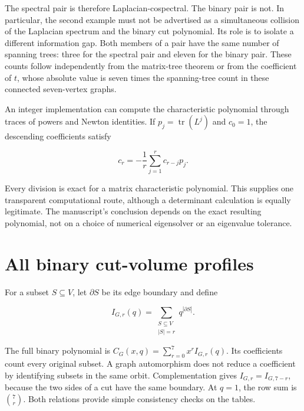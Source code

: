 \documentclass[
  11pt,
  a4paper,
]{report}
\begin{document}
The spectral pair is therefore Laplacian-cospectral. The binary pair is
not. In particular, the second example must not be advertised as a
simultaneous collision of the Laplacian spectrum and the binary cut
polynomial. Its role is to isolate a different information gap. Both
members of a pair have the same number of spanning trees: three for the
spectral pair and eleven for the binary pair. These counts follow
independently from the matrix-tree theorem or from the coefficient of
\(t\), whose absolute value is seven times the spanning-tree count in
these connected seven-vertex graphs.

An integer implementation can compute the characteristic polynomial
through traces of powers and Newton identities. If
\(p_j=\operatorname{tr}(L^j)\) and \(c_0=1\), the descending
coefficients satisfy

\[
c_r=-\frac1r\sum_{j=1}^r c_{r-j}p_j.
\]

Every division is exact for a matrix characteristic polynomial. This
supplies one transparent computational route, although a determinant
calculation is equally legitimate. The manuscript's conclusion depends
on the exact resulting polynomial, not on a choice of numerical
eigensolver or an eigenvalue tolerance.

\hypertarget{all-binary-cut-volume-profiles}{%
\section{All binary cut-volume
profiles}\label{all-binary-cut-volume-profiles}}

For a subset \(S\subseteq V\), let \(\partial S\) be its edge boundary
and define

\[
I_{G,r}(q)=\sum_{\substack{S\subseteq V\\ |S|=r}}q^{|\partial S|}.
\]

The full binary polynomial is \(C_G(x,q)=\sum_{r=0}^7x^rI_{G,r}(q)\).
Its coefficients count every original subset. A graph automorphism does
not reduce a coefficient by identifying subsets in the same orbit.
Complementation gives \(I_{G,r}=I_{G,7-r}\), because the two sides of a
cut have the same boundary. At \(q=1\), the row sum is \(\binom7r\).
Both relations provide simple consistency checks on the tables.
\end{document}
